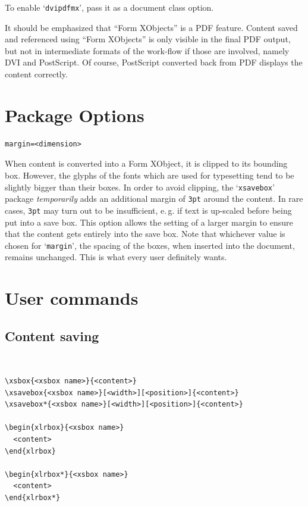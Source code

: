 \documentclass[a4paper]{article}
\begin{document}
To enable `\verb+dvipdfmx+', pass it as a document class option.

It should be emphasized that \enquote{Form XObjects} is a PDF feature. Content saved and referenced using \enquote{Form XObjects} is only visible in the final PDF output, but not in intermediate formats of the work-flow if those are involved, namely DVI and PostScript. Of course, PostScript converted back from PDF displays the content correctly.

\section{Package Options}
\begin{Verbatim}
margin=<dimension>  
\end{Verbatim}
When content is converted into a Form XObject, it is clipped to its bounding box. However, the glyphs of the fonts which are used for typesetting tend to be slightly bigger than their boxes. In order to avoid clipping, the `\verb+xsavebox+' package \emph{temporarily} adds an additional margin of \verb+3pt+ around the content. In rare cases, \verb+3pt+ may turn out to be insufficient, e.\,g. if text is up-scaled before being put into a save box. This option allows the setting of a larger margin to ensure that the content gets entirely into the save box. Note that whichever value is chosen for `\verb+margin+', the spacing of the boxes, when inserted into the document, remains unchanged. This is what every user definitely wants.

\section{User commands}
\subsection*{Content saving}
\vspace{-1\baselineskip}
\hrulefill\\[-1.6\baselineskip]
\begin{Verbatim}
\xsbox{<xsbox name>}{<content>}
\xsavebox{<xsbox name>}[<width>][<position>]{<content>}
\xsavebox*{<xsbox name>}[<width>][<position>]{<content>}

\begin{xlrbox}{<xsbox name>}
  <content>
\end{xlrbox}

\begin{xlrbox*}{<xsbox name>}
  <content>
\end{xlrbox*}
\end{Verbatim}
\vspace{-1\baselineskip}
\hrulefill\\[-1\baselineskip]
\end{document}
